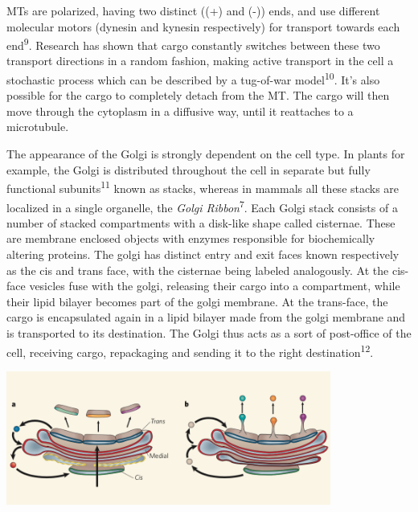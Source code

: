 \documentclass[12pt,a4paper,]{Dissertate}
\let\origfigure\figure
\let\endorigfigure\endfigure
\renewenvironment{figure}[1][2] {
    \expandafter\origfigure\expandafter[H]
} {
    \endorigfigure
}
\begin{document}
MTs are polarized, having two distinct ((+) and (-)) ends, and use
different molecular motors (dynesin and kynesin respectively) for
transport towards each end\textsuperscript{9}. Research has shown that
cargo constantly switches between these two transport directions in a
random fashion, making active transport in the cell a stochastic process
which can be described by a tug-of-war model\textsuperscript{10}. It's
also possible for the cargo to completely detach from the MT. The cargo
will then move through the cytoplasm in a diffusive way, until it
reattaches to a microtubule.

The appearance of the Golgi is strongly dependent on the cell type. In
plants for example, the Golgi is distributed throughout the cell in
separate but fully functional subunits\textsuperscript{11} known as
stacks, whereas in mammals all these stacks are localized in a single
organelle, the \emph{Golgi Ribbon}\textsuperscript{7}. Each Golgi stack
consists of a number of stacked compartments with a disk-like shape
called cisternae. These are membrane enclosed objects with enzymes
responsible for biochemically altering proteins. The golgi has distinct
entry and exit faces known respectively as the cis and trans face, with
the cisternae being labeled analogously. At the cis-face vesicles fuse
with the golgi, releasing their cargo into a compartment, while their
lipid bilayer becomes part of the golgi membrane. At the trans-face, the
cargo is encapsulated again in a lipid bilayer made from the golgi
membrane and is transported to its destination. The Golgi thus acts as a
sort of post-office of the cell, receiving cargo, repackaging and
sending it to the right destination\textsuperscript{12}.

\begin{figure}
\hypertarget{fig:golgimodels}{%
\centering
\includegraphics[width=0.8\textwidth]{source/figures/png/golgimodels.png}
\caption{\textbf{Left panel}: the cisternal maturation model.
\textbf{Right panel}: the vesicle-shuttle model. Image taken from
13}
\label{fig:golgimodels}
}
\end{figure}
\end{document}
